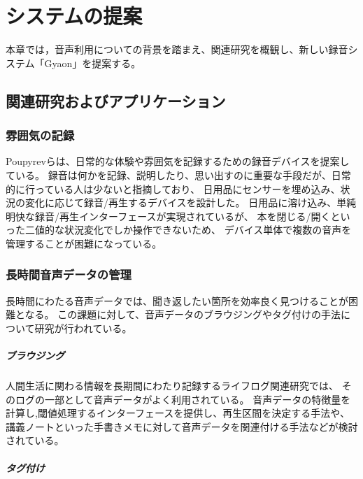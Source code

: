 \chapter{システムの提案}
\label{chap:proposal}

本章では，音声利用についての背景を踏まえ、関連研究を概観し、新しい録音システム「Gyaon」を提案する。

\newpage

\section{関連研究およびアプリケーション}

\subsection{雰囲気の記録}

Poupyrevらは、日常的な体験や雰囲気を記録するための録音デバイスを提案している\cite{Poupyrev}。
録音は何かを記録、説明したり、思い出すのに重要な手段だが、日常的に行っている人は少ないと指摘しており、
日用品にセンサーを埋め込み、状況の変化に応じて録音/再生するデバイスを設計した。
日用品に溶け込み、単純明快な録音/再生インターフェースが実現されているが、
本を閉じる/開くといった二値的な状況変化でしか操作できないため、
デバイス単体で複数の音声を管理することが困難になっている。

\subsection{長時間音声データの管理}

長時間にわたる音声データでは、聞き返したい箇所を効率良く見つけることが困難となる。
この課題に対して、音声データのブラウジングやタグ付けの手法について研究が行われている。

\paragraph*{ブラウジング}

人間生活に関わる情報を長期間にわたり記録するライフログ関連研究では、
そのログの一部として音声データがよく利用されている\cite{Bell}。
音声データの特徴量を計算し,閾値処理するインターフェースを提供し、再生区間を決定する手法\cite{Kawamura}や、
講義ノートといった手書きメモに対して音声データを関連付ける手法\cite{Stifelman}などが検討されている。

\paragraph*{タグ付け}


